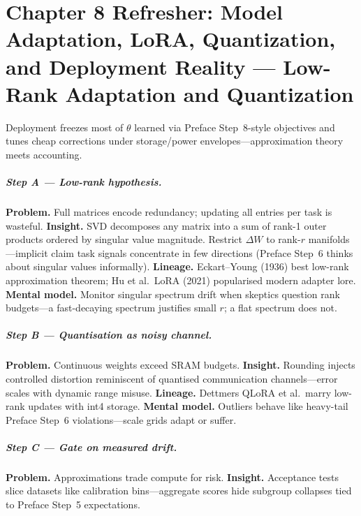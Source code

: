 \chapter{Chapter 8 Refresher: Model Adaptation, LoRA, Quantization, and Deployment Reality --- Low-Rank Adaptation and Quantization}
\label{chap:adaptation}

\scenelabel
Deployment freezes most of \(\theta\) learned via Preface Step~8-style objectives and tunes cheap corrections under storage/power envelopes---approximation theory meets accounting.

\paragraph{Step A --- Low-rank hypothesis.}
\textbf{Problem.} Full matrices encode redundancy; updating all entries per task is wasteful.
\textbf{Insight.} SVD decomposes any matrix into a sum of rank-1 outer products ordered by singular value magnitude. Restrict \(\Delta W\) to rank-\(r\) manifolds---implicit claim task signals concentrate in few directions (Preface Step~6 thinks about singular values informally).
\textbf{Lineage.} Eckart--Young (1936) best low-rank approximation theorem; Hu et al.\ LoRA (2021) popularised modern adapter lore.
\textbf{Mental model.} Monitor singular spectrum drift when skeptics question rank budgets---a fast-decaying spectrum justifies small $r$; a flat spectrum does not.

\paragraph{Step B --- Quantisation as noisy channel.}
\textbf{Problem.} Continuous weights exceed SRAM budgets.
\textbf{Insight.} Rounding injects controlled distortion reminiscent of quantised communication channels---error scales with dynamic range misuse.
\textbf{Lineage.} Dettmers QLoRA et al.\ marry low-rank updates with int4 storage.
\textbf{Mental model.} Outliers behave like heavy-tail Preface Step~6 violations---scale grids adapt or suffer.

\paragraph{Step C --- Gate on measured drift.}
\textbf{Problem.} Approximations trade compute for risk.
\textbf{Insight.} Acceptance tests slice datasets like calibration bins---aggregate scores hide subgroup collapses tied to Preface Step~5 expectations.

